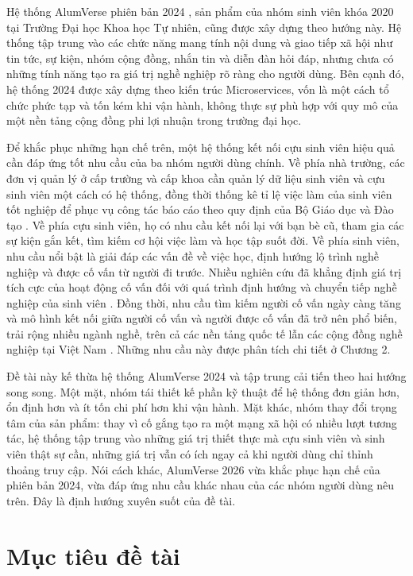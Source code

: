 \documentclass[12pt,a4paper,oneside]{report}
\begin{document}
Hệ thống AlumVerse phiên bản 2024 \cite{alumverse}, sản phẩm của nhóm sinh viên khóa 2020 tại Trường Đại học Khoa học Tự nhiên, cũng được xây dựng theo hướng này. Hệ thống tập trung vào các chức năng mang tính nội dung và giao tiếp xã hội như tin tức, sự kiện, nhóm cộng đồng, nhắn tin và diễn đàn hỏi đáp, nhưng chưa có những tính năng tạo ra giá trị nghề nghiệp rõ ràng cho người dùng. Bên cạnh đó, hệ thống 2024 được xây dựng theo kiến trúc Microservices, vốn là một cách tổ chức phức tạp và tốn kém khi vận hành, không thực sự phù hợp với quy mô của một nền tảng cộng đồng phi lợi nhuận trong trường đại học.

Để khắc phục những hạn chế trên, một hệ thống kết nối cựu sinh viên hiệu quả cần đáp ứng tốt nhu cầu của ba nhóm người dùng chính. Về phía nhà trường, các đơn vị quản lý ở cấp trường và cấp khoa cần quản lý dữ liệu sinh viên và cựu sinh viên một cách có hệ thống, đồng thời thống kê tỉ lệ việc làm của sinh viên tốt nghiệp để phục vụ công tác báo cáo theo quy định của Bộ Giáo dục và Đào tạo \cite{moet}. Về phía cựu sinh viên, họ có nhu cầu kết nối lại với bạn bè cũ, tham gia các sự kiện gắn kết, tìm kiếm cơ hội việc làm và học tập suốt đời. Về phía sinh viên, nhu cầu nổi bật là giải đáp các vấn đề về việc học, định hướng lộ trình nghề nghiệp và được cố vấn từ người đi trước. Nhiều nghiên cứu đã khẳng định giá trị tích cực của hoạt động cố vấn đối với quá trình định hướng và chuyển tiếp nghề nghiệp của sinh viên \cite{nabi}. Đồng thời, nhu cầu tìm kiếm người cố vấn ngày càng tăng và mô hình kết nối giữa người cố vấn và người được cố vấn đã trở nên phổ biến, trải rộng nhiều ngành nghề, trên cả các nền tảng quốc tế \cite{adplist} lẫn các cộng đồng nghề nghiệp tại Việt Nam \cite{mentori}. Những nhu cầu này được phân tích chi tiết ở Chương 2.

Đề tài này kế thừa hệ thống AlumVerse 2024 và tập trung cải tiến theo hai hướng song song. Một mặt, nhóm tái thiết kế phần kỹ thuật để hệ thống đơn giản hơn, ổn định hơn và ít tốn chi phí hơn khi vận hành. Mặt khác, nhóm thay đổi trọng tâm của sản phẩm: thay vì cố gắng tạo ra một mạng xã hội có nhiều lượt tương tác, hệ thống tập trung vào những giá trị thiết thực mà cựu sinh viên và sinh viên thật sự cần, những giá trị vẫn có ích ngay cả khi người dùng chỉ thỉnh thoảng truy cập. Nói cách khác, AlumVerse 2026 vừa khắc phục hạn chế của phiên bản 2024, vừa đáp ứng nhu cầu khác nhau của các nhóm người dùng nêu trên. Đây là định hướng xuyên suốt của đề tài.

\section{Mục tiêu đề tài}
\end{document}
